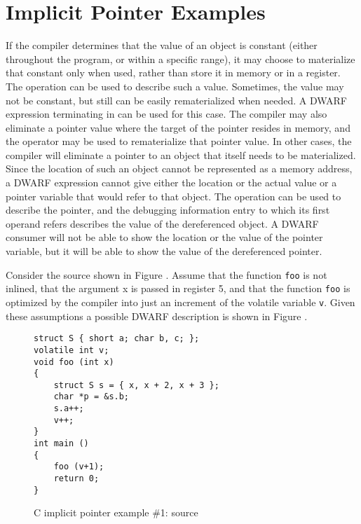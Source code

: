 \section{Implicit Pointer Examples}
\label{app:implicitpointerexamples}
If the compiler determines that the value of an object is
constant (either throughout the program, or within a specific
range), it may choose to materialize that constant only when
used, rather than store it in memory or in a register. The
\DWOPimplicitvalue{} operation can be used to describe such a
value. Sometimes, the value may not be constant, but still can be
easily rematerialized when needed. A DWARF expression terminating
in \DWOPstackvalue{} can be used for this case. The compiler may
also eliminate a pointer value where the target of the pointer
resides in memory, and the \DWOPstackvalue{} operator may be used
to rematerialize that pointer value. In other cases, the compiler
will eliminate a pointer to an object that itself needs to be
materialized. Since the location of such an object cannot be
represented as a memory address, a DWARF expression cannot give
either the location or the actual value or a pointer variable
that would refer to that object. The \DWOPimplicitpointer{}
operation can be used to describe the pointer, and the debugging
information entry to which its first operand refers describes the
value of the dereferenced object. A DWARF consumer will not be
able to show the location or the value of the pointer variable,
but it will be able to show the value of the dereferenced
pointer.

Consider the  source shown in 
Figure .
Assume that the function \texttt{foo} is not inlined,
that the argument x is passed in register 5, and that the
function \texttt{foo} is optimized by the compiler into just 
an increment of the volatile variable \texttt{v}. Given these
assumptions a possible DWARF description is shown in
Figure .

\begin{figure}[ht]
\begin{lstlisting}
struct S { short a; char b, c; };
volatile int v;
void foo (int x)
{
    struct S s = { x, x + 2, x + 3 };
    char *p = &s.b;
    s.a++;
    v++;
}
int main ()
{
    foo (v+1);
    return 0;
}
\end{lstlisting}
\caption{C implicit pointer example \#1: source}
\label{fig:cimplicitpointerexample1source}
\end{figure}

